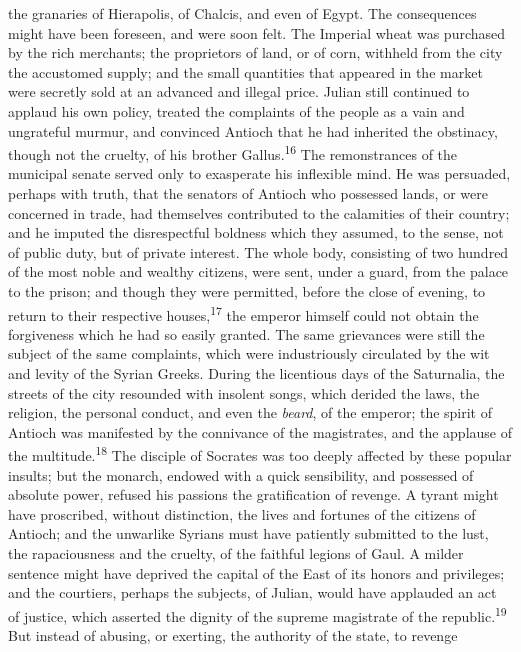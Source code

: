 the granaries of Hierapolis, of Chalcis, and even of Egypt. The
consequences might have been foreseen, and were soon felt. The
Imperial wheat was purchased by the rich merchants; the
proprietors of land, or of corn, withheld from the city the
accustomed supply; and the small quantities that appeared in the
market were secretly sold at an advanced and illegal price.
Julian still continued to applaud his own policy, treated the
complaints of the people as a vain and ungrateful murmur, and
convinced Antioch that he had inherited the obstinacy, though not
the cruelty, of his brother Gallus.\textsuperscript{16} The remonstrances of the
municipal senate served only to exasperate his inflexible mind.
He was persuaded, perhaps with truth, that the senators of
Antioch who possessed lands, or were concerned in trade, had
themselves contributed to the calamities of their country; and he
imputed the disrespectful boldness which they assumed, to the
sense, not of public duty, but of private interest. The whole
body, consisting of two hundred of the most noble and wealthy
citizens, were sent, under a guard, from the palace to the
prison; and though they were permitted, before the close of
evening, to return to their respective houses,\textsuperscript{17} the emperor
himself could not obtain the forgiveness which he had so easily
granted. The same grievances were still the subject of the same
complaints, which were industriously circulated by the wit and
levity of the Syrian Greeks. During the licentious days of the
Saturnalia, the streets of the city resounded with insolent
songs, which derided the laws, the religion, the personal
conduct, and even the \textit{beard}, of the emperor; the spirit of
Antioch was manifested by the connivance of the magistrates, and
the applause of the multitude.\textsuperscript{18} The disciple of Socrates was
too deeply affected by these popular insults; but the monarch,
endowed with a quick sensibility, and possessed of absolute
power, refused his passions the gratification of revenge. A
tyrant might have proscribed, without distinction, the lives and
fortunes of the citizens of Antioch; and the unwarlike Syrians
must have patiently submitted to the lust, the rapaciousness and
the cruelty, of the faithful legions of Gaul. A milder sentence
might have deprived the capital of the East of its honors and
privileges; and the courtiers, perhaps the subjects, of Julian,
would have applauded an act of justice, which asserted the
dignity of the supreme magistrate of the republic.\textsuperscript{19} But instead
of abusing, or exerting, the authority of the state, to revenge
